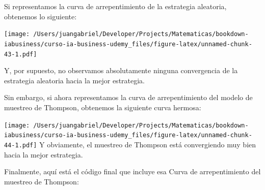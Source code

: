 \documentclass[]{book}
\begin{document}
Si representamos la curva de arrepentimiento de la estrategia aleatoria, obtenemos lo siguiente:

\texttt{[image: /Users/juangabriel/Developer/Projects/Matematicas/bookdown-iabusiness/curso-ia-business-udemy\_files/figure-latex/unnamed-chunk-43-1.pdf]}

Y, por supuesto, no observamos absolutamente ninguna convergencia de la estrategia aleatoria hacia la mejor estrategia.

Sin embargo, si ahora representamos la curva de arrepentimiento del modelo de muestreo de Thompson, obtenemos la siguiente curva hermosa:

\texttt{[image: /Users/juangabriel/Developer/Projects/Matematicas/bookdown-iabusiness/curso-ia-business-udemy\_files/figure-latex/unnamed-chunk-44-1.pdf]}
Y obviamente, el muestreo de Thompson está convergiendo muy bien hacia la mejor estrategia.

Finalmente, aquí está el código final que incluye esa Curva de arrepentimiento del muestreo de Thompson:
\end{document}
